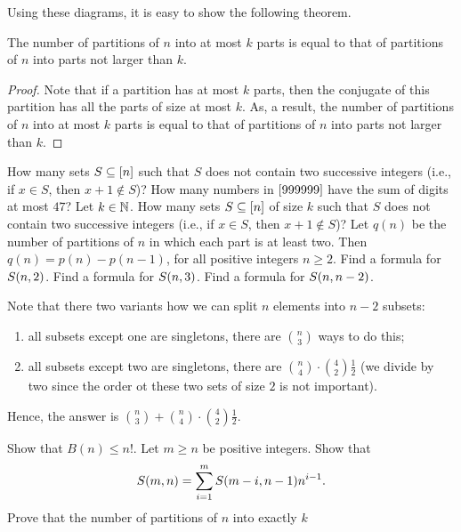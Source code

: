 Using these diagrams, it is easy to show the following theorem.
\begin{theorem}
  The number of partitions of $n$ into at most $k$ parts is equal to that of
  partitions of $n$ into parts not larger than $k$.
\end{theorem}
\begin{proof}
  Note that if a partition has at most $k$ parts, then the conjugate of this
  partition has all the parts of size at most $k$. As, a result, the number
  of partitions of $n$ into at most $k$ parts is equal to that of
  partitions of $n$ into parts not larger than $k$.
\end{proof}

\begin{chapterendexercises}
  \exercise How many sets $S \subseteq {[{n}]}$ such that $S$ does not contain
    two successive integers (i.e., if $x \in S$, then $x + 1 \not\in S$)?
  \exercise How many numbers in ${[{999999}]}$ have the sum of digits at most
    $47$?
  \exercise Let $k \in {\mathbb{N}}$. How many sets $S \subseteq {[{n}]}$ of size $k$
    such that $S$ does not contain two successive integers (i.e., if $x \in S$,
    then $x + 1 \not\in S$)?
  \exercise
    Let $q(n)$ be the number of partitions of $n$ in which each part is at least
    two. Then $q(n) = p(n) - p(n - 1)$, for all positive integers $n \ge 2$.
  \exercise[recommended] Find a formula for $S({n}, {2})$.
  \exercise Find a formula for $S({n}, {3})$.
  \exercise Find a formula for $S({n}, {n - 2})$.
    \begin{solution}
      Note that there two variants how we can split $n$ elements into $n - 2$ subsets: 
      \begin{enumerate}
        \item all subsets except one are singletons, there are $\binom{n}{3}$
          ways to do this;
        \item all subsets except two are singletons, there are $\binom{n}{4} \cdot
          \binom{4}{2} \frac{1}{2}$ (we divide by two since the order ot these two
          sets of size $2$ is not important).
      \end{enumerate}
      Hence, the answer is $\binom{n}{3} + \binom{n}{4} \cdot \binom{4}{2} \frac{1}{2}$.
    \end{solution}
  \exercise[recommended] Show that $B(n) \le n!$.
  \exercise Let $m \ge n$ be positive integers. Show that
    \[
      S({m}, {n}) = \sum_{i = 1}^m S({m - i}, {n - 1}) n^{i - 1}.
    \]
  \exercise Prove that the number of partitions of $n$ into exactly $k$

\end{chapterendexercises}
